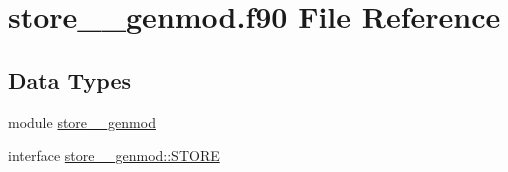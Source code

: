 \hypertarget{store____genmod_8f90}{\section{store\+\_\+\+\_\+genmod.\+f90 File Reference}
\label{store____genmod_8f90}
}
\subsection*{Data Types}
\begin{DoxyCompactItemize}
\item 
module \hyperlink{classstore____genmod}{store\+\_\+\+\_\+genmod}
\item 
interface \hyperlink{interfacestore____genmod_1_1STORE}{store\+\_\+\+\_\+genmod\+::\+S\+T\+O\+R\+E}
\end{DoxyCompactItemize}
